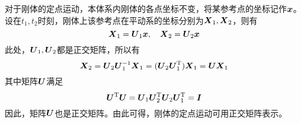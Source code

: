 对于刚体的定点运动，本体系内刚体的各点坐标不变，将某参考点的坐标记作$\boldsymbol{x}$。设在$t_1,t_2$时刻，刚体上该参考点在平动系的坐标分别为$\boldsymbol{X}_1,\boldsymbol{X}_2$，则有
\begin{equation*}
	\boldsymbol{X}_1 = \boldsymbol{U}_1 \boldsymbol{x},\quad \boldsymbol{X}_2 = \boldsymbol{U}_2 \boldsymbol{x}
\end{equation*}
此处，$\boldsymbol{U}_1,\boldsymbol{U}_2$都是正交矩阵，所以有
\begin{equation*}
	\boldsymbol{X}_2 = \boldsymbol{U}_2 \boldsymbol{U}_1^{-1} \boldsymbol{X}_1 = (\boldsymbol{U}_2 \boldsymbol{U}_1^{\mathrm{T}}) \boldsymbol{X}_1 = \boldsymbol{U} \boldsymbol{X}_1
\end{equation*}
其中矩阵$\boldsymbol{U}$满足
\begin{equation*}
	\boldsymbol{U}^{\mathrm{T}} \boldsymbol{U} = \boldsymbol{U}_1 \boldsymbol{U}_2^{\mathrm{T}} \boldsymbol{U}_2 \boldsymbol{U}_1^{\mathrm{T}} = \boldsymbol{I}
\end{equation*}
因此，矩阵$\boldsymbol{U}$也是正交矩阵。由此可得，刚体的定点运动可用正交矩阵表示。

\iffalse
\begin{example}[有限角位移的非对易性]

\begin{figure}[htb]
\centering
\begin{asy}
	size(200);
	//刚体的定轴转动
	pair O,n,R,RR;
	real theta,l,r,r1,r2;
	path cir;
	picture tmp;
	O = (0,0);
	theta = 70;
	n = dir(theta);
	l = 2;
	r = 0.8;
	r1 = -0.2;
	r2 = -0.05;
	draw(Label("$\boldsymbol{n}$",EndPoint),O--O+l*n,Arrow);
	cir = scale(r)*unitcircle;
	draw(tmp,cir);
	R = relpoint(cir,r1);
	RR = relpoint(cir,r2);
	draw(tmp,R--O--RR);
	draw(tmp,R--RR,red,Arrow);
	draw(tmp,Label(rotate(90-theta)*"$\phi$",EndPoint,Relative(E)),arc(O,0.2,degrees(R),degrees(RR)),Arrow);
	add(shift(2/3*l*n)*rotate(theta-90)*yscale(1/3)*tmp);
	R = shift(2/3*l*n)*rotate(theta-90)*yscale(1/3)*R;
	RR = shift(2/3*l*n)*rotate(theta-90)*yscale(1/3)*RR;
	//draw(R--2/3*l*n--RR);
	//draw(R--RR,red,Arrow);
	draw(Label("$\boldsymbol{R}$",MidPoint,Relative(E)),O--R,Arrow);
	draw(Label("$\boldsymbol{R}'$",MidPoint,Relative(E)),O--RR,Arrow);
	//draw(O--(1.3,0),invisible);
\end{asy}
\caption{刚体的定轴转动}
\label{刚体的定轴转动}
\end{figure}

考虑刚体绕指向为$\mbf{n}$的转动轴旋转$\theta$，即{\heiti 定轴转动}，如图\ref{刚体的定轴转动}所示。定轴转动是定点运动的特例，因此可用矩阵表示为
\begin{equation*}
	\mbf{X}' = \mbf{U}\mbf{X}
\end{equation*}
如果进行两次定轴转动（转轴指向可以不同），那么可有
\begin{equation*}
	\mbf{X}'' = \mbf{U}' \mbf{X}' = \mbf{U}' \mbf{U} \mbf{X}
\end{equation*}
由于矩阵的乘积具有不可交换性，因此有限角位移一般不具有对易性，因而不能用矢量表示。
\end{example}\fi

